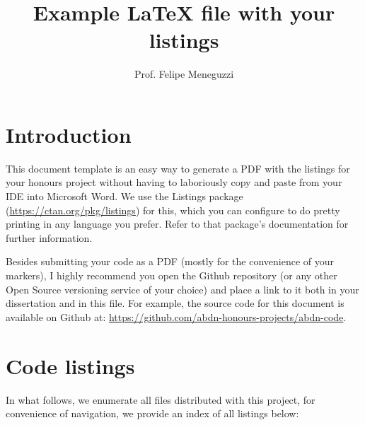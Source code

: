 \documentclass[a4paper]{article}
\title{Example LaTeX file with your listings}
\author{Prof. Felipe Meneguzzi}
\begin{document}
\maketitle

\section*{Introduction}

This document template is an easy way to generate a PDF with the listings for your honours project without having to laboriously copy and paste from your IDE into Microsoft Word. We use the Listings package (\url{https://ctan.org/pkg/listings}) for this, which you can configure to do pretty printing in any language you prefer. Refer to that package's documentation for further information. 

Besides submitting your code as a PDF (mostly for the convenience of your markers), I highly recommend you open the Github repository (or any other Open Source versioning service of your choice) and place a link to it both in your dissertation and in this file. 
For example, the source code for this document is available on Github at: \url{https://github.com/abdn-honours-projects/abdn-code}.

\section*{Code listings}

In what follows, we enumerate all files distributed with this project, for convenience of navigation, we provide an index of all listings below:

\lstlistoflistings














\end{document}
